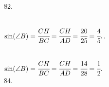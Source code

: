 \documentclass[12pt]{article}
\begin{document}
82. \begin{figure}[ht!]
\end{figure}\\
$\sin(\angle B)=\cfrac{CH}{BC}=\cfrac{CH}{AD}=\cfrac{20}{25}=\cfrac{4}{5}.$\newpage{}. \begin{figure}[ht!]
\end{figure}\\
$\sin(\angle B)=\cfrac{CH}{BC}=\cfrac{CH}{AD}=\cfrac{14}{28}=\cfrac{1}{2}.$\\
84. \begin{figure}[ht!]
\end{figure}\\
\end{document}
